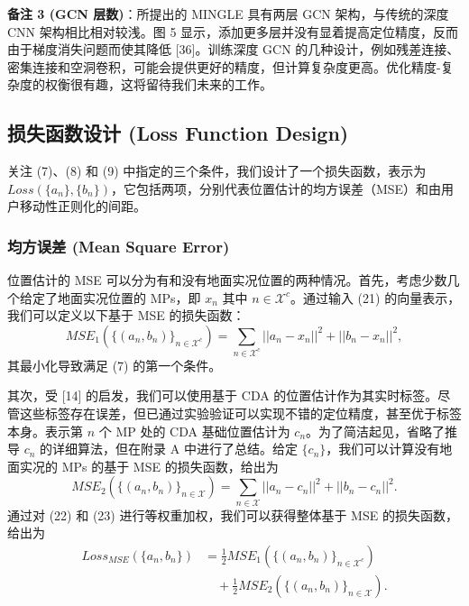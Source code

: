 \documentclass[journal]{IEEEtran}
\begin{document}
\textbf{备注 3 (GCN 层数)}：所提出的 MINGLE 具有两层 GCN 架构，与传统的深度 CNN 架构相比相对较浅。图 5 显示，添加更多层并没有显着提高定位精度，反而由于梯度消失问题而使其降低 [36]。训练深度 GCN 的几种设计，例如残差连接、密集连接和空洞卷积，可能会提供更好的精度，但计算复杂度更高。优化精度-复杂度的权衡很有趣，这将留待我们未来的工作。

\subsection{损失函数设计 (Loss Function Design)}
关注 (7)、(8) 和 (9) 中指定的三个条件，我们设计了一个损失函数，表示为 $Loss(\{a_{n}\},\{b_{n}\})$，它包括两项，分别代表位置估计的均方误差（MSE）和由用户移动性正则化的间距。

\subsubsection{均方误差 (Mean Square Error)}
位置估计的 MSE 可以分为有和没有地面实况位置的两种情况。首先，考虑少数几个给定了地面实况位置的 MPs，即 $x_{n}$ 其中 $n\in\mathcal{X}^{c}$。通过输入 (21) 的向量表示，我们可以定义以下基于 MSE 的损失函数：
\begin{equation}
MSE_{1}(\{(a_{n},b_{n})\}_{n\in\mathcal{X}^{c}})=\sum_{n\in\mathcal{X}^{c}}||a_{n}-x_{n}||^{2}+||b_{n}-x_{n}||^{2}, \label{eq:22}
\end{equation}
其最小化导致满足 (7) 的第一个条件。

其次，受 [14] 的启发，我们可以使用基于 CDA 的位置估计作为其实时标签。尽管这些标签存在误差，但已通过实验验证可以实现不错的定位精度，甚至优于标签本身。表示第 $n$ 个 MP 处的 CDA 基础位置估计为 $c_{n}$。为了简洁起见，省略了推导 $c_{n}$ 的详细算法，但在附录 A 中进行了总结。给定 $\{c_{n}\}$，我们可以计算没有地面实况的 MPs 的基于 MSE 的损失函数，给出为
\begin{equation}
MSE_{2}(\{(a_{n},b_{n})\}_{n\in\mathcal{X}})=\sum_{n\in\mathcal{X}}||a_{n}-c_{n}||^{2}+||b_{n}-c_{n}||^{2}. \label{eq:23}
\end{equation}
通过对 (22) 和 (23) 进行等权重加权，我们可以获得整体基于 MSE 的损失函数，给出为
\begin{align}
Loss_{MSE}(\{a_{n},b_{n}\}) &= \frac{1}{2}MSE_{1}(\{(a_{n},b_{n})\}_{n\in\mathcal{X}^{c}}) \nonumber \\
&\quad +\frac{1}{2}MSE_{2}(\{(a_{n},b_{n})\}_{n\in\mathcal{X}}) . \label{eq:24}
\end{align}
\end{document}
